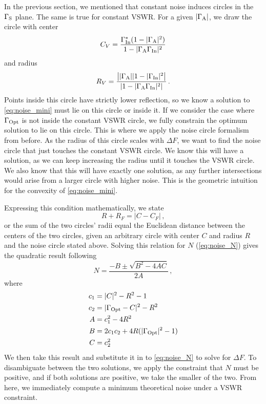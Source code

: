 In the previous section, we mentioned that constant noise induces circles in the $\Gamma_{\text{S}}$ plane.
The same is true for constant VSWR.
For a given $|\Gamma_{\text{A}}|$, we draw the circle with center
%
\begin{equation}
    C_V = \frac{\Gamma_{\text{In}}^*(1-|\Gamma_{\text{A}}|^2)}{1 - |\Gamma_{\text{A}}\Gamma_{\text{In}}|^2}
\end{equation}
and radius
%
\begin{equation}
    R_V = \frac{\left||\Gamma_{\text{A}}||1-|\Gamma_{\text{In}}|^2\right|}{\left|1-|\Gamma_{\text{A}}\Gamma_{\text{In}}|^2\right|}\,.
\end{equation}
%
Points inside this circle have strictly lower reflection, so we know a solution to \autoref{eq:noise_mini} must lie on this circle or inside it.
If we consider the case where $\Gamma_{\text{Opt}}$ is not inside the constant VSWR circle, we fully constrain the optimum solution to lie on this circle.
This is where we apply the noise circle formalism from before.
As the radius of this circle scales with $\Delta F$, we want to find the noise circle that just touches the constant VSWR circle.
We know this will have a solution, as we can keep increasing the radius until it touches the VSWR circle.
We also know that this will have exactly one solution, as any further intersections would arise from a larger circle with higher noise.
This is the geometric intuition for the convexity of \autoref{eq:noise_mini}.

Expressing this condition mathematically, we state
%
\begin{equation}
    R + R_F = |C-C_F|\,,
\end{equation}
%
or the sum of the two circles' radii equal the Euclidean distance between the centers of the two circles, given an arbitrary circle with center $C$ and radius $R$ and the noise circle stated above.
Solving this relation for $N$ (\autoref{eq:noise_N}) gives the quadratic result following~\cite{linkAnalyticalExpressionsSimplifying1995}
%
\begin{equation}
    N = \frac{-B\pm\sqrt{B^2-4AC}}{2A}\,,
    \label{eq:min_n_touch}
\end{equation}
%
where
\begin{align*}
    c_1 &= |C|^2 - R^2 - 1 \\
    c_2 &= |\Gamma_{\text{Opt}}-C|^2 - R^2 \\
    A &= c_1^2 - 4R^2 \\
    B &= 2c_1c_2 + 4R(|\Gamma_{\text{Opt}}|^2 - 1) \\
    C &= c_2^2
\end{align*}
%
We then take this result and substitute it in to \autoref{eq:noise_N} to solve for $\Delta F$.
To disambiguate between the two solutions, we apply the constraint that $N$ must be positive, and if both solutions are positive, we take the smaller of the two.
From here, we immediately compute a minimum theoretical noise under a VSWR constraint.

